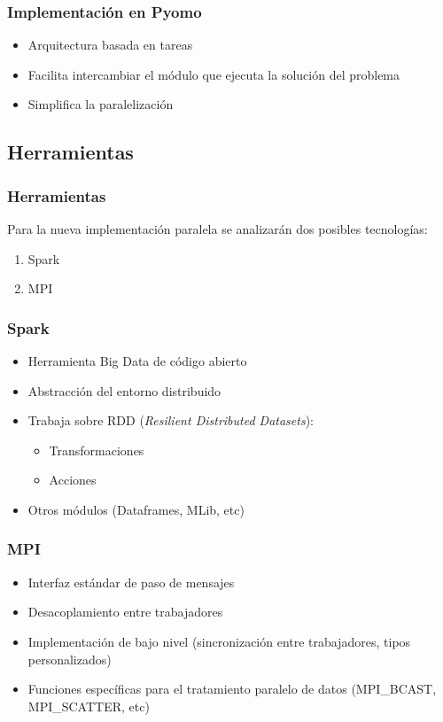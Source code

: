 \documentclass{beamer}
\begin{document}
\begin{frame}
    \frametitle{Implementación en Pyomo}
    \begin{itemize}
        \item Arquitectura basada en tareas
        \item Facilita intercambiar el módulo que ejecuta la solución del problema
        \item Simplifica la paralelización
    \end{itemize}
\end{frame}

\subsection{Herramientas}

\begin{frame}{}
    \frametitle{Herramientas}
    Para la nueva implementación paralela se analizarán dos posibles tecnologías:
    \begin{enumerate}
        \item Spark
        \item MPI
    \end{enumerate}
\end{frame}

\begin{frame}
    \frametitle{Spark}
    \begin{itemize}
        \item Herramienta Big Data de código abierto \pause
        \item Abstracción del entorno distribuido \pause
        \item Trabaja sobre RDD (\textit{Resilient Distributed Datasets}):
        \begin{itemize}
            \item Transformaciones
            \item Acciones \pause
        \end{itemize}
        \item Otros módulos (Dataframes, MLib, etc)
    \end{itemize}
\end{frame}

\begin{frame}{}
    \frametitle{MPI}
    \begin{itemize}
        \item Interfaz estándar de paso de mensajes
        \item Desacoplamiento entre trabajadores
        \item Implementación de bajo nivel (sincronización entre trabajadores, tipos personalizados)
        \item Funciones específicas para el tratamiento paralelo de datos (MPI\_BCAST, MPI\_SCATTER, etc)
    \end{itemize}
\end{frame}
\end{document}
